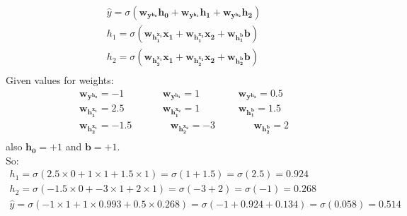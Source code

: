 \documentclass[12pt]{article}
\makeatletter
\newcommand*{\rom}[1]{\expandafter\@slowromancap\romannumeral #1@}
\makeatother
\begin{document}
\begin{qsolve}[Part \rom{1}]
    \begin{gather*}
        \hat{y} = \sigma(\mathbf{w_{y^{h_0}}}\mathbf{h_0} + \mathbf{w_{y^{h_1}}}\mathbf{h_1} + \mathbf{w_{y^{h_2}}}\mathbf{h_2}) \\
        h_1 = \sigma(\mathbf{w_{h_1^{x_1}}}\mathbf{x_1} + \mathbf{w_{h_1^{x_2}}}\mathbf{x_2} + \mathbf{w_{h_1^{b}}}\mathbf{b}) \\
        h_2 = \sigma(\mathbf{w_{h_2^{x_1}}}\mathbf{x_1} + \mathbf{w_{h_2^{x_2}}}\mathbf{x_2} + \mathbf{w_{h_2^{b}}}\mathbf{b}) \\
    \end{gather*}
    Given values for weights:
    \begin{gather*}
        \mathbf{w_{y^{h_0}}} = -1 \; \; \; \; \; \; \; \; \; \; \; \; \; \; \mathbf{w_{y^{h_1}}} = 1 \; \; \; \; \; \; \; \; \; \; \; \; \; \; \mathbf{w_{y^{h_2}}} = 0.5 \\
        \mathbf{w_{h_1^{x_1}}} = 2.5 \; \; \; \; \; \; \; \; \; \; \; \; \; \; \mathbf{w_{h_1^{x_2}}} = 1 \; \; \; \; \; \; \; \; \; \; \; \; \; \; \mathbf{w_{h_1^{b}}} = 1.5 \\
        \mathbf{w_{h_2^{x_1}}} = -1.5 \; \; \; \; \; \; \; \; \; \; \; \; \; \; \mathbf{w_{h_2^{x_2}}} = -3 \; \; \; \; \; \; \; \; \; \; \; \; \; \; \mathbf{w_{h_2^{b}}} = 2 \\
    \end{gather*}
    also $\mathbf{h_0} = +1$ and $\mathbf{b} = +1$.\\
    So:
    \begin{gather*}
        h_1 = \sigma(2.5 \times 0 + 1 \times 1 + 1.5 \times 1) = \sigma(1 + 1.5) = \sigma(2.5) = 0.924 \\
        h_2 = \sigma(-1.5 \times 0 + -3 \times 1 + 2 \times 1) = \sigma(-3 + 2) = \sigma(-1) = 0.268 \\
        \hat{y} = \sigma(-1 \times 1 + 1 \times 0.993 + 0.5 \times 0.268) = \sigma(-1 + 0.924 + 0.134) = \sigma(0.058) = 0.514
    \end{gather*}
\end{qsolve}
\end{document}
